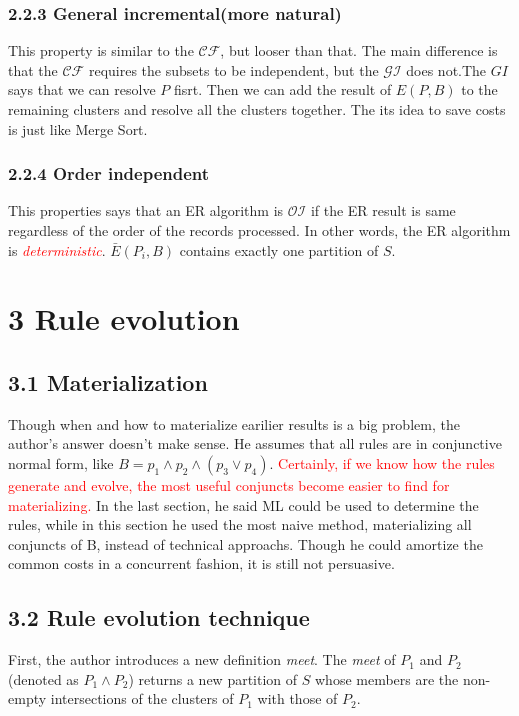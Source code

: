 \documentclass[12pt,a4paper]{report}
\begin{document}
\subsubsection*{2.2.3 General incremental(more natural)}
This property is similar to the $\mathcal{CF}$, but looser than that. The main difference is that the $\mathcal{CF}$ requires the subsets to be independent, but the $\mathcal{GI}$ does not.The $GI$ says that we can resolve $P$ fisrt. Then we can add the result of $E(P,B)$ to the remaining clusters and resolve all the clusters together. The its idea to save costs is just like 
Merge Sort. 
\subsubsection*{2.2.4 Order independent}
This properties says that an ER algorithm is $\mathcal{OI}$ if the ER result is same regardless of the order of the records processed. In other words, the ER algorithm is \textcolor{red}{\emph{deterministic}}. $\bar{E}(P_{i}, B)$ contains exactly one partition of $S$.

\section*{3 Rule evolution}
\subsection*{3.1 Materialization}
Though when and how to materialize earilier results is a big problem, the author's answer doesn't make sense. He assumes that all rules are in conjunctive normal form, like $B=p_{1}\wedge p_{2}\wedge (p_{3}\vee p_{4})$. \textcolor{red}{Certainly, if we know how the rules generate and evolve, the most useful conjuncts become easier to find for materializing.} In the last section, he said ML could be used to determine the rules, while in this section he used the most naive method, materializing all conjuncts of B, instead of technical approachs. Though he could amortize the common costs in a concurrent fashion, it is still not persuasive. 
\subsection*{3.2 Rule evolution technique}
First, the author introduces a new definition \emph{meet}. The \emph{meet} of $P_{1}$ and $P_{2}$(denoted as $P_{1}\wedge P_{2}$) returns a new partition of $S$ whose members are the non-empty intersections of the clusters of $P_{1}$ with those of $P_{2}$. 
\end{document}
